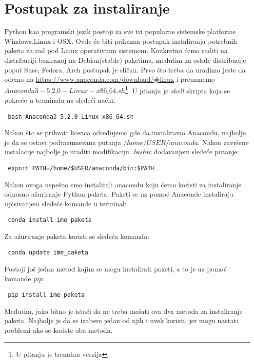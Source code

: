 \documentclass[12pt]{article}
\begin{document}
\newpage
\section{Postupak za instaliranje}
Python kao programski jezik postoji za sve tri popularne sistemske platforme Windows,Linux i OSX. Ovde će biti prikazan postupak instaliranja potrebnih paketa za rad pod Linux operativnim sistemom. Konkretno ćemo raditi na distribuciji baziranoj na Debian(stable) paketima, međutim za ostale distribucije poput Suse, Fedora, Arch postupak je sličan.
Prvo što treba da uradimo jeste da odemo na \url{https://www.anaconda.com/download/#linux} i preuzmemo $Anaconda3-5.2.0-Linux-x86{\_64}.sh$\footnote{U pitanju je trenutna verzija}. U pitanju je \textsl{shell} skripta koja se pokreće u terminalu na sledeći način: 
\begin{lstlisting}
 bash Anaconda3-5.2.0-Linux-x86_64.sh
\end{lstlisting}
Nakon što se prihvati licenca određujemo gde da instaliramo Anacondu, najbolje je da se ostavi podrazumevana putanja $/home/USER/anaconda$. Nakon završene instalacije najbolje je uraditi modifikaciju \textsl{.bashrc} dodavanjem sledeće putanje:
\begin{lstlisting}
 export PATH=/home/$USER/anaconda/bin:$PATH
\end{lstlisting}
Nakon ovoga uspešno smo instalirali anacondu koju ćemo koristi za instaliranje odnosno ažuriranje Python paketa. Paketi se uz pomoć Anaconde instaliraju upisivanjem sledeće komande u terminal:
\begin{lstlisting}
 conda install ime_paketa 
\end{lstlisting}
Za ažuriranje paketa koristi se sledeća komanda:
\begin{lstlisting}
 conda update ime_paketa 
\end{lstlisting}
Postoji još jedan metod kojim se mogu instalirati paketi, a to je uz pomoć komande \textsl{pip}:
\begin{lstlisting}
 pip install ime_paketa 
\end{lstlisting}
Međutim, jako bitno je istaći da ne treba mešati ova dva metoda za instaliranje paketa. Najbolje je da se izabere jedan od njih i uvek koristi, jer mogu nastati problemi ako se koriste oba metoda. 
\end{document}
